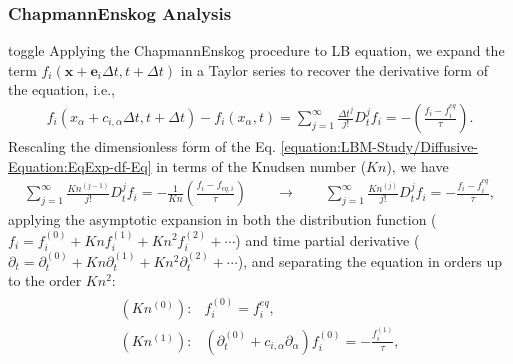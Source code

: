 \documentclass[letterpaper,10pt,english,openany,oneside]{jupyterBook}
\begin{document}
\subsubsection{Chapmann\sphinxhyphen{}Enskog Analysis}
\label{\detokenize{LBM-Study/Diffusive-Equation:chapmann-enskog-analysis}}
\begin{sphinxuseclass}{toggle}
\sphinxAtStartPar
Applying the Chapmann\sphinxhyphen{}Enskog procedure to LB equation, we expand the term \(f_{i}\left(\boldsymbol{x}+\boldsymbol{e}_i \Delta t, t+\Delta t\right)\) in a Taylor series to recover the derivative form of the equation, i.e.,
\begin{equation}\label{equation:LBM-Study/Diffusive-Equation:EqExp-df-Eq}
\begin{split}
f_{i}\left( x_{\alpha} + c_{i,\alpha} \Delta t, t+\Delta t\right)- f_{i}( x_{\alpha}, t)=\displaystyle\sum_{j=1}^{\infty}\frac{\Delta t^{j}}{j!}D_{t}^{j}f_{i}= -\left( \frac{ f_{i} - f_{i}^{eq} }{ \tau } \right).
\end{split}
\end{equation}
\sphinxAtStartPar
Rescaling the dimensionless form of the Eq. \eqref{equation:LBM-Study/Diffusive-Equation:EqExp-df-Eq} in terms of the Knudsen number (\(Kn\)), we have
\begin{equation*}
\begin{split}
\displaystyle \sum^{\infty}_{j=1}  \frac{Kn^{(j-1)}}{j!} D_{t}^{j} f_{i} = - \frac{1}{Kn}\left( \frac{ f_{i} - f_{eq,i} }{ \tau } \right) \quad \quad \rightarrow \quad \quad \displaystyle \sum^{\infty}_{j=1}  \frac{Kn^{(j)}}{j!} D_{t}^{j} f_{i} = -  \frac{ f_{i} - f_{i}^{eq} }{ \tau },
\end{split}
\end{equation*}
\sphinxAtStartPar
applying the asymptotic expansion in both the distribution function (\(f_{i}=f_{i}^{(0)}+Kn f_{i}^{(1)} + Kn^{2} f_{i}^{(2)}+\cdots\)) and time partial derivative (\(\partial_{t}=\partial_{t}^{(0)}+ Kn \partial_{t}^{(1)}+Kn^{2} \partial_{t}^{(2)}+\cdots\)), and separating the equation in orders up to the order \(Kn^{2}\):
\begin{equation}\label{equation:LBM-Study/Diffusive-Equation:Chap-Kn-df-Eq}
\begin{split}
\begin{array}{ll}
    (Kn^{(0)}):& f_{i}^{(0)}= f_{i}^{eq},\\
    (Kn^{(1)}):& \left( \partial_{t}^{(0)} + c_{i,\alpha}\partial_{\alpha} \right)f_{i}^{(0)}= - \displaystyle\frac{ f_{i}^{(1)} }{ \tau } , \\

\end{array}
\end{split}
\end{equation}
\end{sphinxuseclass}
\end{document}
